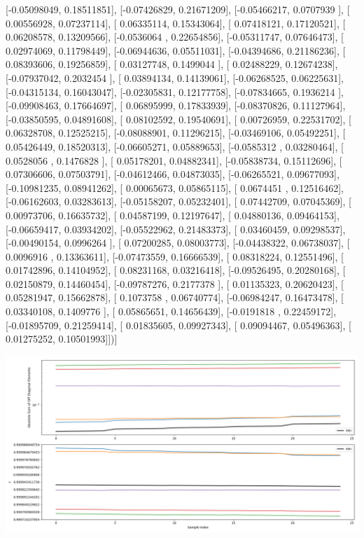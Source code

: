 \documentclass{article}
\begin{document}
       [-0.05098049,  0.18511851],
       [-0.07426829,  0.21671209],
       [-0.05466217,  0.0707939 ],
       [ 0.00556928,  0.07237114],
       [ 0.06335114,  0.15343064],
       [ 0.07418121,  0.17120521],
       [ 0.06208578,  0.13209566],
       [-0.0536064 ,  0.22654856],
       [-0.05311747,  0.07646473],
       [ 0.02974069,  0.11798449],
       [-0.06944636,  0.05511031],
       [-0.04394686,  0.21186236],
       [ 0.08393606,  0.19256859],
       [ 0.03127748,  0.1499044 ],
       [ 0.02488229,  0.12674238],
       [-0.07937042,  0.2032454 ],
       [ 0.03894134,  0.14139061],
       [-0.06268525,  0.06225631],
       [-0.04315134,  0.16043047],
       [-0.02305831,  0.12177758],
       [-0.07834665,  0.1936214 ],
       [-0.09908463,  0.17664697],
       [ 0.06895999,  0.17833939],
       [-0.08370826,  0.11127964],
       [-0.03850595,  0.04891608],
       [ 0.08102592,  0.19540691],
       [ 0.00726959,  0.22531702],
       [ 0.06328708,  0.12525215],
       [-0.08088901,  0.11296215],
       [-0.03469106,  0.05492251],
       [ 0.05426449,  0.18520313],
       [-0.06605271,  0.05889653],
       [-0.0585312 ,  0.03280464],
       [ 0.0528056 ,  0.1476828 ],
       [ 0.05178201,  0.04882341],
       [-0.05838734,  0.15112696],
       [ 0.07306606,  0.07503791],
       [-0.04612466,  0.04873035],
       [-0.06265521,  0.09677093],
       [-0.10981235,  0.08941262],
       [ 0.00065673,  0.05865115],
       [ 0.0674451 ,  0.12516462],
       [-0.06162603,  0.03283613],
       [-0.05158207,  0.05232401],
       [ 0.07442709,  0.07045369],
       [ 0.00973706,  0.16635732],
       [ 0.04587199,  0.12197647],
       [ 0.04880136,  0.09464153],
       [-0.06659417,  0.03934202],
       [-0.05522962,  0.21483373],
       [ 0.03460459,  0.09298537],
       [-0.00490154,  0.0996264 ],
       [ 0.07200285,  0.08003773],
       [-0.04438322,  0.06738037],
       [ 0.0096916 ,  0.13363611],
       [-0.07473559,  0.16666539],
       [ 0.08318224,  0.12551496],
       [ 0.01742896,  0.14104952],
       [ 0.08231168,  0.03216418],
       [-0.09526495,  0.20280168],
       [ 0.02150879,  0.14460454],
       [-0.09787276,  0.2177378 ],
       [ 0.01135323,  0.20620423],
       [ 0.05281947,  0.15662878],
       [ 0.1073758 ,  0.06740774],
       [-0.06984247,  0.16473478],
       [ 0.03340108,  0.1409776 ],
       [ 0.05865651,  0.14656439],
       [-0.0191818 ,  0.22459172],
       [-0.01895709,  0.21259414],
       [ 0.01835605,  0.09927343],
       [ 0.09094467,  0.05496363],
       [ 0.01275252,  0.10501993]])]
\begin{center}
\includegraphics[scale=.9]{report_pickled_controls209/control_dpn_all.png}

\end{center}
\end{document}
